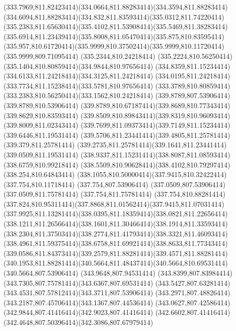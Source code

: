 {{	\curveto(333.7969,811.82423414)(334.0664,811.88283414)(334.3594,811.88283414)
	\curveto(334.6094,811.88283414)(334.832,811.83593414)(335.0312,811.74220414)
	\curveto(335.2383,811.65630414)(335.4102,811.53908414)(335.5469,811.38283414)
	\curveto(335.6914,811.23439414)(335.8008,811.05470414)(335.875,810.83595414)
	\curveto(335.957,810.61720414)(335.9999,810.37502414)(335.9999,810.11720414)
	\lineto(335.9999,809.71095414)
	\closepath
	\moveto(335.2344,810.24218414)
	\curveto(335.2224,810.56250414)(335.1404,810.80859414)(334.9844,810.97656414)
	\curveto(334.8359,811.15234414)(334.6133,811.24218414)(334.3125,811.24218414)
	\curveto(334.0195,811.24218414)(333.7734,811.15238414)(333.5781,810.97656414)
	\curveto(333.3789,810.80859414)(333.2383,810.56250414)(333.1562,810.24218414)
	\closepath
	\moveto(339.8789,807.53906414)
	\lineto(339.8789,810.53906414)
	\curveto(339.8789,810.67187414)(339.8689,810.77343414)(339.8629,810.83593414)
	\curveto(339.8509,810.89843414)(339.8319,810.96093414)(339.8009,811.02343414)
	\curveto(339.7699,811.09373414)(339.7149,811.15234414)(339.6446,811.19531414)
	\curveto(339.5706,811.23441414)(339.4805,811.25781414)(339.379,811.25781414)
	\curveto(339.2735,811.25781414)(339.1641,811.23441414)(339.0509,811.19531414)
	\curveto(338.9337,811.15231414)(338.8087,811.08593414)(338.6759,810.99218414)
	\curveto(338.5509,810.90628414)(338.4102,810.79297414)(338.254,810.64843414)
	\curveto(338.1055,810.50000414)(337.9415,810.32422414)(337.754,810.11718414)
	\lineto(337.754,807.53906414)
	\lineto(337.0509,807.53906414)
	\lineto(337.0509,811.75781414)
	\lineto(337.754,811.75781414)
	\lineto(337.754,810.88281414)
	\curveto(337.824,810.95311414)(337.8868,811.01562414)(337.9415,811.07031414)
	\curveto(337.9925,811.13281414)(338.0395,811.18359414)(338.0821,811.22656414)
	\curveto(338.1211,811.26566414)(338.1601,811.30466414)(338.1914,811.33593414)
	\curveto(338.2304,811.37503414)(338.2774,811.41793414)(338.3321,811.46093414)
	\curveto(338.4961,811.59375414)(338.6758,811.69921414)(338.8633,811.77343414)
	\curveto(339.0586,811.84373414)(339.2579,811.88281414)(339.4571,811.88281414)
	\curveto(340.1953,811.88281414)(340.5664,811.48437414)(340.5664,810.69531414)
	\lineto(340.5664,807.53906414)
	\closepath
	\moveto(343.9648,807.94531414)
	\curveto(343.8399,807.83984414)(343.7305,807.75781414)(343.6367,807.69531414)
	\curveto(343.5427,807.63281414)(343.4531,807.57812414)(343.3711,807.53906414)
	\curveto(343.2971,807.48826414)(343.2187,807.45706414)(343.1367,807.44536414)
	\curveto(343.0627,807.42586414)(342.9844,807.41416414)(342.9023,807.41416414)
	\curveto(342.6602,807.41416414)(342.4648,807.50396414)(342.3086,807.67979414)
}}

